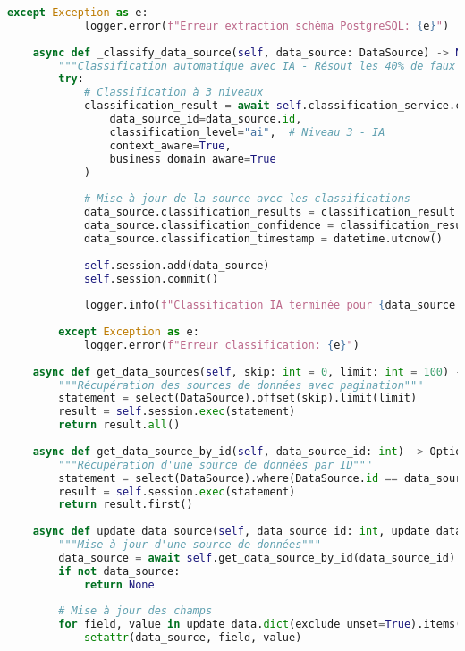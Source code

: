 \begin{lstlisting}[language=Python, caption=Service DataSourceService - Résolution des Limitations Microsoft Purview]
        except Exception as e:
            logger.error(f"Erreur extraction schéma PostgreSQL: {e}")
    
    async def _classify_data_source(self, data_source: DataSource) -> None:
        """Classification automatique avec IA - Résout les 40% de faux positifs Purview"""
        try:
            # Classification à 3 niveaux
            classification_result = await self.classification_service.classify_data_source(
                data_source_id=data_source.id,
                classification_level="ai",  # Niveau 3 - IA
                context_aware=True,
                business_domain_aware=True
            )
            
            # Mise à jour de la source avec les classifications
            data_source.classification_results = classification_result
            data_source.classification_confidence = classification_result.get("confidence", 0.0)
            data_source.classification_timestamp = datetime.utcnow()
            
            self.session.add(data_source)
            self.session.commit()
            
            logger.info(f"Classification IA terminée pour {data_source.name}: {classification_result.get('confidence', 0)}%")
            
        except Exception as e:
            logger.error(f"Erreur classification: {e}")
    
    async def get_data_sources(self, skip: int = 0, limit: int = 100) -> List[DataSource]:
        """Récupération des sources de données avec pagination"""
        statement = select(DataSource).offset(skip).limit(limit)
        result = self.session.exec(statement)
        return result.all()
    
    async def get_data_source_by_id(self, data_source_id: int) -> Optional[DataSource]:
        """Récupération d'une source de données par ID"""
        statement = select(DataSource).where(DataSource.id == data_source_id)
        result = self.session.exec(statement)
        return result.first()
    
    async def update_data_source(self, data_source_id: int, update_data: DataSourceUpdate) -> Optional[DataSource]:
        """Mise à jour d'une source de données"""
        data_source = await self.get_data_source_by_id(data_source_id)
        if not data_source:
            return None
        
        # Mise à jour des champs
        for field, value in update_data.dict(exclude_unset=True).items():
            setattr(data_source, field, value)
        

\end{lstlisting}
